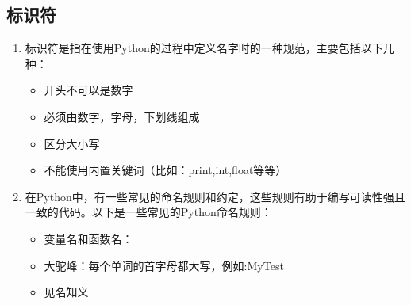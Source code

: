 
\subsection{标识符}

\begin{enumerate}
\item 标识符是指在使用Python的过程中定义名字时的一种规范，主要包括以下几种：
\begin{itemize}
\item 开头不可以是数字
\item 必须由数字，字母，下划线组成
\item 区分大小写
\item 不能使用内置关键词（比如：print,int,float等等）
\end{itemize}
\item 在Python中，有一些常见的命名规则和约定，这些规则有助于编写可读性强且一致的代码。以下是一些常见的Python命名规则：
\begin{itemize}
\item 变量名和函数名：

\item 大驼峰：每个单词的首字母都大写，例如:MyTest 
\item 见名知义
\end{itemize}
\end{enumerate}